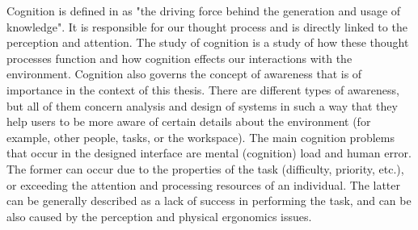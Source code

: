 Cognition is defined in \cite[Chapter~3.4]{jr_3d_2017} as "the driving force behind the generation and usage of knowledge". It is responsible for our thought process and is directly linked to the perception and attention. The study of cognition is a study of how these thought processes function and how cognition effects our interactions with the environment.
Cognition also governs the concept of awareness that is of importance in the context of this thesis. There are different types of awareness, but all of them concern analysis and design of systems in such a way that they help users to be more aware of certain details about the environment (for example, other people, tasks, or the workspace).
The main cognition problems that occur in the designed interface are mental (cognition) load and human error. The former can occur due to the properties of the task (difficulty, priority, etc.), or exceeding the attention and processing resources of an individual. The latter can be generally described as a lack of success in performing the task, and can be also caused by the perception and physical ergonomics issues.


